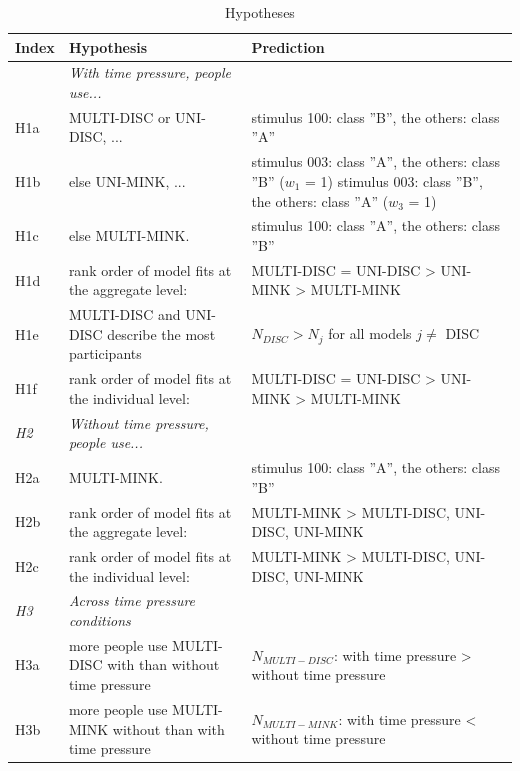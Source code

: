 \documentclass[a4paper,man,natbib]{apa6}
\begin{document}
\begin{table}
\begin{center}
\begin{threeparttable}
\caption{Hypotheses}
\label{tab:hypotheses}
\begin{tabular*}{\textwidth}{lp{110mm}p{110mm}}
\toprule
\multicolumn{1}{l}{Index} & \multicolumn{1}{l}{Hypothesis} & \multicolumn{1}{l}{Prediction}\\
\midrule
\addlinespace
\multicolumn{1}{l}{\emph{H1}} & \multicolumn{1}{l}{\emph{With time pressure, people use...}} \\
\addlinespace
H1a & MULTI-DISC or UNI-DISC, ... & stimulus 100: class ''B'', the others: class ''A''\\
\addlinespace
H1b & else UNI-MINK, ...  & stimulus 003: class ''A'', the others: class ''B'' ($w_1$ = 1) \newline stimulus 003: class ''B'', the others: class ''A'' ($w_3$ = 1)\\
\addlinespace
H1c & else MULTI-MINK. & stimulus 100: class ''A'', the others: class ''B''\\
\addlinespace
H1d & rank order of model fits at the aggregate level: & MULTI-DISC = UNI-DISC > UNI-MINK > MULTI-MINK\\
\addlinespace
H1e & MULTI-DISC and UNI-DISC describe the most participants & $N_{DISC} > N_{j}$ for all models $j \neq$ DISC\\
\addlinespace
H1f & rank order of model fits at the individual level: & MULTI-DISC = UNI-DISC > UNI-MINK > MULTI-MINK\\
\midrule
\multicolumn{1}{l}{\emph{H2}} & \multicolumn{1}{l}{\emph{Without time pressure, people use...}} \\
\addlinespace
H2a & MULTI-MINK. & stimulus 100: class ''A'', the others: class ''B''\\
\addlinespace
H2b & rank order of model fits at the aggregate level: & MULTI-MINK > {MULTI-DISC, UNI-DISC, UNI-MINK}\\
\addlinespace
H2c & rank order of model fits at the individual level: & MULTI-MINK > {MULTI-DISC, UNI-DISC, UNI-MINK}\\
\midrule
\multicolumn{1}{l}{\emph{H3}} & \multicolumn{1}{l}{\emph{Across time pressure conditions}} \\
\addlinespace
H3a & more people use MULTI-DISC with than without time pressure & $N_{MULTI-DISC}$: with time pressure > without time pressure\\
\addlinespace
H3b & more people use MULTI-MINK without than with time pressure & $N_{MULTI-MINK}$: with time pressure < without time pressure\\

\end{tabular*}
\end{threeparttable}
\end{center}
\end{table}
\end{document}
